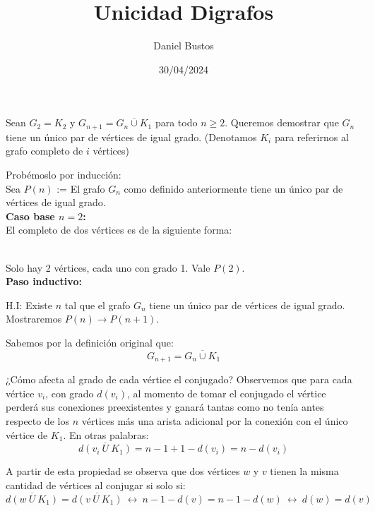 \documentclass{article}
\author{Daniel Bustos}
\title{Unicidad Digrafos}
\date{30/04/2024}
\begin{document}
\maketitle


Sean $G_2 = K_2$ y $G_{n+1} = \overline{G_n \cup K_1}$ para todo $n \geq 2$. Queremos demostrar que $G_n$ tiene un único par de vértices de igual grado. (Denotamos $K_i$ para referirnos al grafo completo de $i$ vértices)

Probémoslo por inducción:\\

Sea $P(n)$ := El grafo $G_n$ como definido anteriormente tiene un único par de vértices de igual grado.\\

\textbf{Caso base $n = 2$:}\\

El completo de dos vértices es de la siguiente forma:
 \\

Solo hay 2 vértices, cada uno con grado 1. Vale $P(2)$.\\

\textbf{Paso inductivo:}

H.I: Existe $n$ tal que el grafo $G_n$ tiene un único par de vértices de igual grado. Mostraremos $P(n) \rightarrow P(n+1)$.

Sabemos por la definición original que:
\[ G_{n+1} = \overline{G_n \cup K_1} \]

¿Cómo afecta al grado de cada vértice el conjugado? Observemos que para cada vértice $v_i$, con grado $d(v_i)$, al momento de tomar el conjugado el vértice perderá sus conexiones preexistentes y ganará tantas como no tenía antes respecto de los $n$ vértices más  una arista adicional por la conexión con el único vértice de $K_1$. En otras palabras:
\[ \overline{d(v_i \ U\  K_1)} = n - 1 + 1 - d(v_i) = n - d(v_i) \]

A partir de esta propiedad se observa que dos vértices $w$ y $v$ tienen la misma cantidad de vértices al conjugar si solo si:
\[ \overline{d(w \ U\  K_1)} = \overline{d(v \ U\  K_1)} \  \leftrightarrow \ n - 1 - d(v) = n - 1 - d(w) \  \leftrightarrow  \ d(w) = d(v) \]
\end{document}

